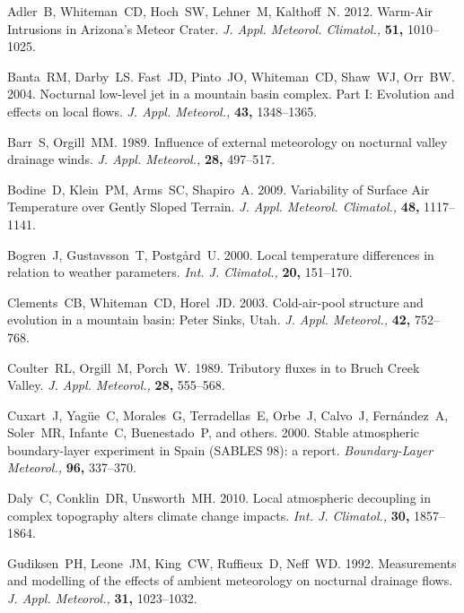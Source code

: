 \documentclass[times]{qjrms4}
\begin{document}
\begin{thebibliography}{99}

Adler~B, Whiteman~CD, Hoch~SW, Lehner~M, Kalthoff~N. 2012.
Warm-Air Intrusions in Arizona's Meteor Crater. \emph{J. Appl. Meteorol. Climatol.,}
{\bf 51,} 1010--1025.

Banta~RM, Darby~LS. Fast~JD, Pinto~JO, Whiteman~CD, Shaw~WJ, Orr~BW. 2004.
Nocturnal low-level jet in a mountain basin complex. Part I: Evolution and effects on local flows. \emph{J. Appl. Meteorol.,} {\bf 43,} 1348--1365.

Barr~S, Orgill~MM. 1989. Influence of external meteorology on nocturnal valley drainage winds. \emph{J. Appl. Meteorol.,} {\bf 28,} 497--517.

Bodine~D, Klein~PM, Arms~SC, Shapiro~A. 2009. Variability of Surface Air Temperature over Gently Sloped Terrain. \emph{J. Appl. Meteorol. Climatol.,} {\bf 48,} 1117--1141.

Bogren~J, Gustavsson~T, Postg{\aa}rd~U. 2000. Local temperature differences in relation to weather parameters. \emph{Int. J. Climatol.,} {\bf 20,} 151--170.

Clements~CB, Whiteman~CD, Horel~JD. 2003. Cold-air-pool structure and evolution in a mountain basin: Peter Sinks, Utah. \emph{J. Appl. Meteorol.,} {\bf 42,} 752--768.

Coulter~RL, Orgill~M, Porch~W. 1989. Tributory fluxes in to Bruch Creek Valley. \emph{J. Appl. Meteorol.,} {\bf 28,} 555--568.

Cuxart~J, Yag{\"u}e~C, Morales~G, Terradellas~E, Orbe~J, Calvo~J, Fern{\'a}ndez~A, Soler~MR, Infante~C, Buenestado~P, and others. 2000. Stable atmospheric boundary-layer experiment in Spain (SABLES 98): a report. \emph{Boundary-Layer Meteorol.,} {\bf 96,} 337--370.

Daly~C, Conklin~DR, Unsworth~MH. 2010. Local atmospheric decoupling in complex topography alters climate change impacts. \emph{Int. J. Climatol.,} {\bf 30,} 1857--1864.

Gudiksen~PH, Leone~JM, King~CW, Ruffieux~D, Neff~WD. 1992. Measurements and modelling of the effects of ambient meteorology on nocturnal drainage flows. \emph{J. Appl. Meteorol.,} {\bf 31,} 1023--1032.


\end{thebibliography}
\end{document}
